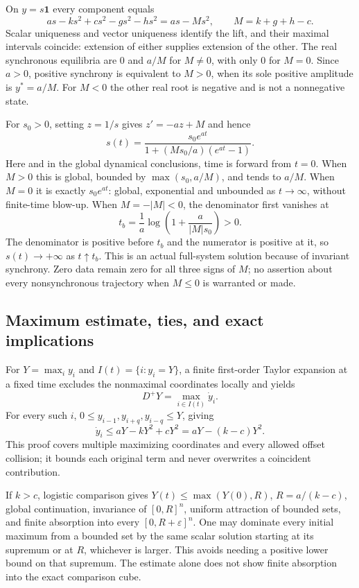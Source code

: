 \documentclass[11pt]{article}
\newcommand{\one}{\mathbf 1}
\begin{document}
On $y=s\one$ every component equals
\[
 as-ks^2+cs^2-gs^2-hs^2=as-Ms^2,\qquad M=k+g+h-c.
\]
Scalar uniqueness and vector uniqueness identify the lift, and their
maximal intervals coincide: extension of either supplies extension of
the other. The real synchronous equilibria are $0$ and $a/M$ for
$M\ne0$, with only $0$ for $M=0$. Since $a>0$, positive synchrony is
equivalent to $M>0$, when its sole positive amplitude is $y^*=a/M$.
For $M<0$ the other real root is negative and is not a nonnegative state.

For $s_0>0$, setting $z=1/s$ gives $z'=-az+M$ and hence
\[
 s(t)=\frac{s_0e^{at}}{1+(Ms_0/a)(e^{at}-1)}.
\]
Here and in the global dynamical conclusions, time is forward from
$t=0$. When $M>0$ this is global, bounded by
$\max(s_0,a/M)$, and tends to $a/M$. When $M=0$ it is exactly
$s_0e^{at}$: global, exponential and unbounded as $t\to\infty$,
without finite-time blow-up. When $M=-|M|<0$, the denominator first
vanishes at
\[
 t_b=\frac1a\log\!\left(1+\frac{a}{|M|s_0}\right)>0.
\]
The denominator is positive before $t_b$ and the numerator is positive
at it, so $s(t)\to+\infty$ as $t\uparrow t_b$. This is an actual
full-system solution because of invariant synchrony. Zero data remain
zero for all three signs of $M$; no assertion about every nonsynchronous
trajectory when $M\le0$ is warranted or made.

\subsection{Maximum estimate, ties, and exact implications}
For $Y=\max_i y_i$ and $I(t)=\{i:y_i=Y\}$, a finite first-order Taylor
expansion at a fixed time excludes the nonmaximal coordinates locally
and yields
\[
 D^+Y=\max_{i\in I(t)}\dot y_i.
\]
For every such $i$, $0\le y_{i-1},y_{i+q},y_{i-q}\le Y$, giving
\[
 \dot y_i\le aY-kY^2+cY^2=aY-(k-c)Y^2.
\]
This proof covers multiple maximizing coordinates and every allowed
offset collision; it bounds each original term and never overwrites a
coincident contribution.

If $k>c$, logistic comparison gives $Y(t)\le\max(Y(0),R)$,
$R=a/(k-c)$, global continuation, invariance of $[0,R]^n$, uniform
attraction of bounded sets, and finite absorption into every
$[0,R+\varepsilon]^n$. One may dominate every initial maximum from a
bounded set by the same scalar solution starting at its supremum or
at $R$, whichever is larger. This avoids needing a positive lower bound
on that supremum. The estimate alone does not show finite absorption
into the exact comparison cube.
\end{document}
